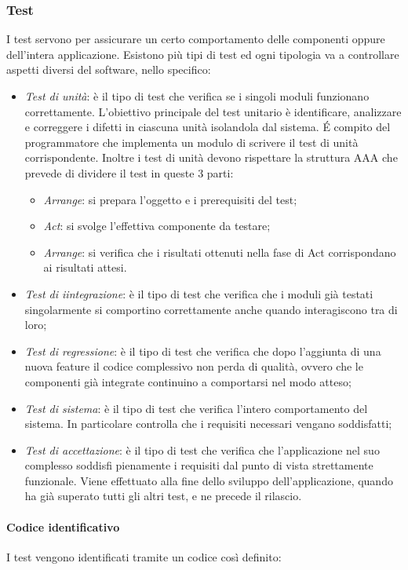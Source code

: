 \subsubsection{Test}
I test servono per assicurare un certo comportamento delle componenti oppure dell'intera applicazione. Esistono più tipi di test ed ogni tipologia va a controllare aspetti diversi del software, nello specifico:
\begin{itemize}
    \item \textit{Test di unità}:  è il tipo di test che verifica se i singoli moduli funzionano correttamente. L'obiettivo principale del test unitario è identificare, analizzare e correggere i difetti in ciascuna unità isolandola dal sistema. É compito del programmatore che implementa un modulo di scrivere il test di unità corrispondente. Inoltre i test di unità devono rispettare la struttura AAA che prevede di dividere il test in queste 3 parti:
	\begin{itemize}
		\item \textit{Arrange}: si prepara l'oggetto e i prerequisiti del test;
		\item \textit{Act}: si svolge l'effettiva componente da testare;
		\item \textit{Arrange}: si verifica che i risultati ottenuti nella fase di Act corrispondano ai risultati attesi.
	\end{itemize}
    \item \textit{Test di iintegrazione}: è il tipo di test che verifica che i moduli già testati singolarmente si comportino correttamente anche quando interagiscono tra di loro;
    \item \textit{Test di regressione}: è il tipo di test che verifica che dopo l'aggiunta di una nuova feature il codice complessivo non perda di qualità, ovvero che le componenti già integrate continuino a comportarsi nel modo atteso;
    \item \textit{Test di sistema}:  è il tipo di test che verifica l'intero comportamento del sistema. In particolare controlla che i requisiti necessari vengano soddisfatti;
    \item \textit{Test di accettazione}:  è il tipo di test che verifica che l'applicazione nel suo complesso soddisfi pienamente i requisiti dal punto di vista strettamente funzionale. Viene effettuato alla fine dello sviluppo dell'applicazione, quando ha già superato tutti gli altri test, e ne precede il rilascio.
\end{itemize}

\paragraph{Codice identificativo}
I test vengono identificati tramite un codice così definito:

